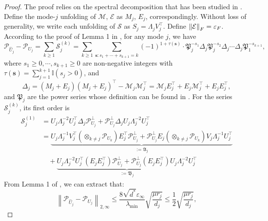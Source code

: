 \documentclass[12pt]{article}
\newcommand{\tF}{{\rm F}}
\newcommand{\norm}[1]{\left\lVert#1\right\rVert}
\newcommand{\cE}{\mathcal{E}}
\newcommand{\cP}{\mathcal{P}}
\newcommand{\cM}{\mathcal{M}}
\newcommand{\cS}{\mathcal{S}}
\theoremstyle{plain}
\begin{document}
\begin{proof}
    The proof relies on the spectral decomposition that has been studied in \cite{ma2024statistical}. Define the mode-$j$ unfolding of $\cM$, $\cE$ as $M_j$, $E_j$, correspondingly. Without loss of generality, we write each unfolding of $\cS$ as $S_j=\Lambda_j V_j^\top$. Define $\norm{\cE}_{\tF }= \varepsilon_{\tF}$. According to the proof of Lemma 1 in \cite{ma2024statistical}, for any mode $j$, we have
    \begin{equation*}
       \cP_{\widehat{U}_j}-\cP_{U_j}= \sum_{k\ge 1} \cS_{j }^{(k)} =  \sum_{k\ge 1} \sum_{\mathbf{s}: s_1+\cdots+s_{k+1}=k}(-1)^{1+\tau(\mathbf{s})} \cdot \mathfrak{P}_j^{-s_1} {\Delta}_{j}\mathfrak{P}_j^{-s_2} {\Delta}_{j} \cdots {\Delta}_{j}\mathfrak{P}_1^{-s_{k+1}},
    \end{equation*}
    where  $s_1\ge 0, \cdots, s_{k+1}\ge 0$ are non-negative integers with $
\tau(\mathbf{s})=\sum_{j=1}^{k+1} \mathbb{I}\left(s_j>0\right)$, and
    \begin{equation*}
        {\Delta}_{j} = (M_j+E_j)(M_j+E_j)^{\top} -\cM_j\cM_j^\top = \cM_j E_j^\top + E_j\cM_j^\top +E_jE_j^\top,
    \end{equation*}
    and $\mathfrak{P}_j$ are the power series whose definition can be found in \cite{xia2021normal,ma2024statistical}. For the series $ \cS_{j }^{(k)} $, its first order is
    \begin{equation*}
\begin{aligned}
             \cS_{j }^{(1)} & =  U_j\Lambda_j^{-2}U_j^\top {\Delta}_{j}
         \cP_{U_j}^\perp  +  \cP_{U_j}^\perp {\Delta}_{j} U_j\Lambda_j^{-2}U_j^\top
         \\
         & = \underbrace{U_j\Lambda_j^{-1} V_j^\top\left(\otimes_{k\neq j}\cP_{U_k}\right) E_j^\top \cP_{U_j}^\perp  +\cP_{U_j}^\perp  E_j \left(\otimes_{k\neq j}\cP_{U_k}\right) V_j \Lambda_j^{-1} U_j^\top }_{:=\mathfrak{A}_j} 
         \\
         & \quad + \underbrace{U_j\Lambda_j^{-2}U_j^\top (E_jE_j^\top) 
         \cP_{U_j}^\perp  + \cP_{U_j}^\perp (E_jE_j^\top)U_j\Lambda_j^{-2}U_j^\top}_{:=\mathfrak{B}_j}
\end{aligned}
    \end{equation*}
From Lemma 1 of \cite{ma2024statistical}, we can extract that:
    \begin{equation}\label{eq:tensor-inco}
   \norm{ \cP_{\widehat{U}_{j}} - \cP_{U_j} }_{2,\infty} \le \frac{8  \sqrt{d^*}\varepsilon_{\infty}}{\lambda_{\min}}\sqrt{\frac{\mu r_j}{d_j} } \le \frac{1}{2} \sqrt{\frac{\mu r_j}{d_j} },

\end{equation}
\end{proof}
\end{document}
